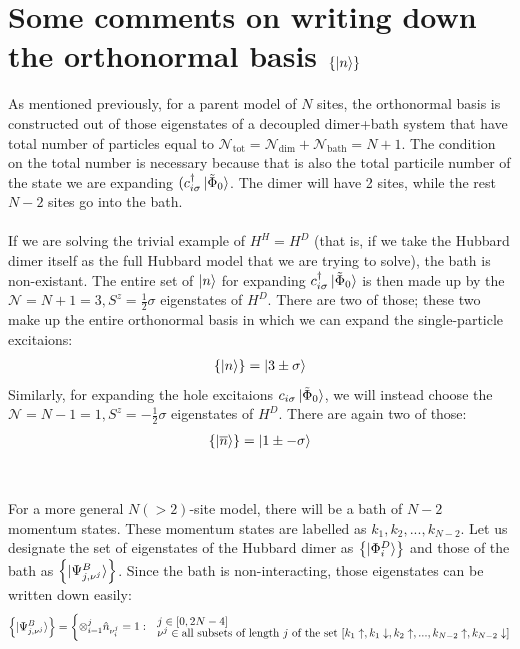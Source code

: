 \documentclass[12pt]{article}
\numberwithin{equation}{section}
\begin{document}
\section{Some comments on writing down the orthonormal basis $\left\{ \ket{n} \right\}$}
As mentioned previously, for a parent model of $N$ sites, the orthonormal basis is constructed out of those eigenstates of a decoupled dimer+bath system that have total number of particles equal to $\mathcal{N}_\text{tot} = \mathcal{N}_\text{dim} + \mathcal{N}_\text{bath} = N+1$. The condition on the total number is necessary because that is also the total particile number of the state we are expanding $(c^\dagger_{i\sigma}\ket{\tilde \Phi_0}$. The dimer will have 2 sites, while the rest $N-2$ sites go into the bath.
\\\\
If we are solving the trivial example of $H^H = H^D$ (that is, if we take the Hubbard dimer itself as the full Hubbard model that we are trying to solve), the bath is non-existant. The entire set of $\ket{n}$ for expanding $c^\dagger_{i\sigma}\ket{\tilde \Phi_0}$ is then made up by the $\mathcal{N} = N + 1 = 3, S^z = \frac{1}{2}\sigma$ eigenstates of $H^D$. There are two of those; these two make up the entire orthonormal basis in which we can expand the single-particle excitaions:
\begin{equation}\begin{aligned}
	\left\{ \ket{n} \right\} = \ket{3 \pm \sigma}
\end{aligned}\end{equation}
Similarly, for expanding the hole excitaions $c_{i\sigma}\ket{\tilde \Phi_0}$, we will instead choose the $\mathcal{N} = N - 1 = 1, S^z = -\frac{1}{2}\sigma$ eigenstates of $H^D$. There are again two of those:
\begin{equation}\begin{aligned}
	\left\{ \ket{\overline n} \right\} = \ket{1 \pm -\sigma}
\end{aligned}\end{equation}
\\\\
For a more general $N(>2)$-site model, there will be a bath of $N-2$ momentum states. These momentum states are labelled as $k_1, k_2, ..., k_{N-2}$. Let us designate the set of eigenstates of the Hubbard dimer as \(\left\{ \ket{\Phi^D_i} \right\} \) and those of the bath as \(\left\{ \ket{\Psi^B_{j, \nu^j}} \right\} \). Since the bath is non-interacting, those eigenstates can be written down easily:
\begin{equation}\begin{aligned}
	\left\{ \ket{\Psi^B_{j, \nu^j}} \right\} = \begin{cases} &  j \in [0, 2N-4]\\[-10pt]
	\otimes_{i=1}^j\hat n_{\nu^j_i} = 1:\\[-10pt]
& \nu^j \in \text{all subsets of length $j$ of the set $\left[k_1 \uparrow, k_1 \downarrow, k_2 \uparrow, ..., k_{N-2} \uparrow, k_{N-2} \downarrow\right]$} \end{cases}
\end{aligned}\end{equation}
\end{document}

